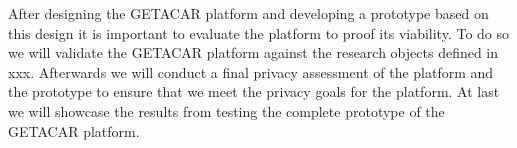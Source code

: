 After designing the GETACAR platform and developing a prototype based on this design it is important to evaluate the platform to proof its viability. To do so we will validate the GETACAR platform against the research objects defined in xxx. Afterwards we will conduct a final privacy assessment of the platform and the prototype to ensure that we meet the privacy goals for the platform. At last we will showcase the results from testing the complete prototype of the GETACAR platform. 